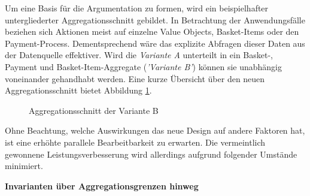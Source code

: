 Um eine Basis für die Argumentation zu formen, wird ein beispielhafter untergliederter Aggregationsschnitt gebildet. In Betrachtung der Anwendungsfälle beziehen sich Aktionen meist auf einzelne Value Objects, Basket-Items oder den Payment-Process. Dementsprechend wäre das explizite Abfragen dieser Daten aus der Datenquelle effektiver. Wird die \emph{Variante A} unterteilt in ein Basket-, Payment und Basket-Item-Aggregate (\emph{'Variante B'}) können sie unabhängig voneinander gehandhabt werden. Eine kurze Übersicht über den neuen Aggregationsschnitt bietet Abbildung \ref{fig:VarB}. 

\begin{figure}[H]
	\centering
	
	\caption{Aggregationsschnitt der Variante B}
	\label{fig:VarB}
\end{figure}

Ohne Beachtung, welche Auswirkungen das neue Design auf andere Faktoren hat, ist eine erhöhte parallele Bearbeitbarkeit zu erwarten. Die vermeintlich gewonnene Leistungsverbesserung wird allerdings aufgrund folgender Umstände minimiert.

\vspace{1em}

\textbf{Invarianten über Aggregationsgrenzen hinweg}

